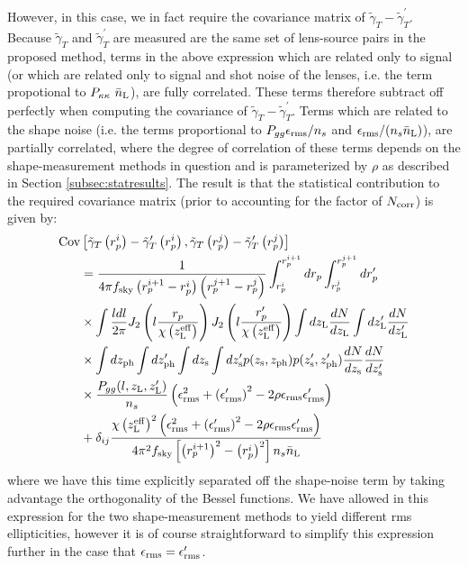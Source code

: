 \documentclass[a4paper,fleqn,usenatbib]{mnras}
\begin{document}
However, in this case, we in fact require the covariance matrix of $\tilde{\gamma}_T - \tilde{\gamma}_T^\prime$. Because $\tilde{\gamma}_T$ and $\tilde{\gamma}_T^\prime$ are measured are the same set of lens-source pairs in the proposed method, terms in the above expression which are related only to signal (or which are related only to signal and shot noise of the lenses, i.e. the term propotional to $P_{\kappa\kappa}\ \bar{n}_{\rm L}$), are fully correlated. These terms therefore subtract off perfectly when computing the covariance of $\tilde{\gamma}_T - \tilde{\gamma}_T^\prime$. Terms which are related to the shape noise (i.e. the terms proportional to $P_{gg} \epsilon_{\rm rms} / n_s$ and $\epsilon_{\rm rms} / (n_s \bar{n}_{\rm L})$), are partially correlated, where the degree of correlation of these terms depends on the shape-measurement methods in question and is parameterized by $\rho$ as described in Section \ref{subsec:statresults}. The result is that the statistical contribution to the required covariance matrix (prior to accounting for the factor of $N_{\rm corr}$) is given by:
\begin{align}
{\rm Cov}&\left[\tilde{\gamma}_T\left(r_p^i\right) - \tilde{\gamma}_T^\prime\left(r_p^i\right),\tilde{\gamma}_T\left(r_p^j\right) - \tilde{\gamma}_T^\prime\left(r_p^j\right) \right] \nonumber \\ &= \frac{1}{4\pi f_{ \rm sky}\left(r_p^{i+1}-r_p^i \right)\left(r_p^{j+1}-r_p^j\right) } \int_{r_p^i}^{r_p^{i+1}} dr_p \int_{r_p^j}^{r_p^{j+1}} dr_p^\prime  \nonumber \\ & \times\int \frac{l dl}{2\pi} J_2\left(l\frac{r_p}{\chi\left(z_{{\rm L}}^{\rm eff}\right)}\right) J_2\left(l\frac{r_p^\prime}{\chi\left(z_{{\rm L}}^{\rm eff}\right)}\right) \int d z_{\rm L} \frac{dN}{dz_{\rm L}} \int d z_{\rm L}^\prime \frac{dN}{dz_{\rm L}^\prime} \nonumber \\ &\times\int d z_{\rm ph} \int d z_{\rm ph}^\prime  \int dz_{\rm s} \int dz_{\rm s}^\prime p(z_{\rm s}, z_{\rm ph}) p(z_{\rm s}^\prime, z_{\rm ph}^\prime)\frac{dN}{dz_{\rm s}} \frac{dN}{dz_{\rm s}^\prime} \nonumber \\ & \times  \frac{P_{gg}(l, z_{\rm L}, z_{\rm L}^\prime)}{n_s} \left(\epsilon_{\rm rms}^2 + \left(\epsilon_{\rm rms}^\prime\right)^2 - 2 \rho \epsilon_{\rm rms} \epsilon_{\rm rms}^\prime \right) \nonumber \\ &+ \delta_{ij} \frac{\chi\left(z_{{\rm L}}^{\rm eff}\right)^2 \left(\epsilon_{\rm rms}^2 +\left(\epsilon_{\rm rms}^\prime\right)^2 - 2 \rho \epsilon_{\rm rms} \epsilon_{\rm rms}^\prime \right)}{4 \pi^2 f_{\rm sky} \left[\left(r_p^{i+1}\right)^2-\left(r_p^i\right)^2\right]n_s \bar{n}_{\rm L}}
\label{GammaCov_diff}
\end{align}
where we have this time explicitly separated off the shape-noise term by taking advantage the orthogonality of the Bessel functions. We have allowed in this expression for the two shape-measurement methods to yield different rms ellipticities, however it is of course straightforward to simplify this expression further in the case that $\epsilon_{\rm rms} = \epsilon_{\rm rms}^\prime$.




\bsp	%
\label{lastpage}
\end{document}
